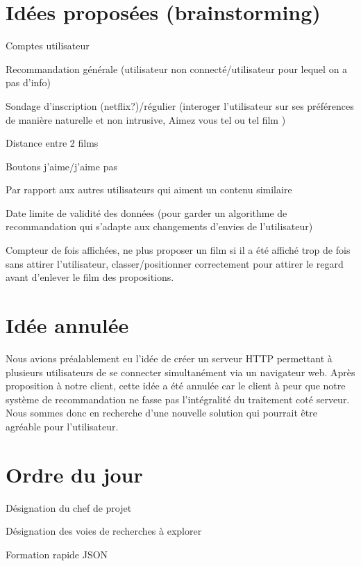 \documentclass[11pt]{meetingmins}
\begin{document}
\section{Idées proposées (brainstorming)}
\begin{items}
	\item Comptes utilisateur
	\item Recommandation générale (utilisateur non connecté/utilisateur pour lequel on a pas d'info)
	\item Sondage d'inscription (netflix?)/régulier (interoger l'utilisateur sur ses préférences de manière naturelle et non intrusive, \og Aimez vous tel ou tel film \fg)
	\item Distance entre 2 films
	\item Boutons j'aime/j'aime pas
	\item Par rapport aux autres utilisateurs qui aiment un contenu similaire
	\item Date limite de validité des données (pour garder un algorithme de recommandation qui s'adapte aux changements d'envies de l'utilisateur)
	\item Compteur de fois affichées, ne plus proposer un film si il a été affiché trop de fois sans attirer l'utilisateur, classer/positionner correctement pour attirer le regard avant d'enlever le film des propositions.
\end{items}
\section{Idée annulée}
Nous avions préalablement eu l'idée de créer un serveur HTTP permettant à plusieurs utilisateurs de se connecter simultanément via un navigateur web.
Après proposition à notre client, cette idée a été annulée car le client à peur que notre système de recommandation ne fasse pas l'intégralité du traitement coté serveur.
Nous sommes donc en recherche d'une nouvelle solution qui pourrait être agréable pour l'utilisateur.
\section{Ordre du jour}
\begin{items}
	\item Désignation du chef de projet
	\item Désignation des voies de recherches à explorer
	\item Formation rapide JSON
\end{items}
\end{document}
